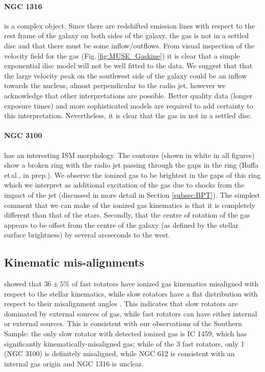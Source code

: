 	\paragraph{NGC 1316} is a complex object. Since there are redshifted emission lines with respect to the rest frame of the galaxy on both sides of the galaxy, the gas is not in a settled disc and that there must be some inflow/outflows. From visual inspection of the velocity field for the gas (Fig.\,\ref{fig:MUSE_Gaskine}) it is clear that a simple exponential disc model will not be well fitted to the data. We suggest that that the large velocity peak on the southwest side of the galaxy could be an inflow towards the nucleus, almost perpendicular to the radio jet, however we acknowledge that other interpretations are possible. Better quality data (longer exposure times) and more sophisticated models are required to add certainty to this interpretation. Nevertheless, it is clear that the gas in not in a settled disc. 


	\paragraph{NGC 3100} has an interesting ISM morphology. The  contours (shown in white in all figures) show a broken ring with the radio jet passing through the gaps in the ring (Ruffa et\,al., in prep.). We observe the ionized gas to be brightest in the gaps of this ring which we interpret as additional excitation of the gas due to shocks from the impact of the jet (discussed in more detail in Section \ref{subsec:BPT}). The simplest comment that we can make of the ionized gas kinematics is that it is completely different than that of the stars. Secondly, that the centre of rotation of the gas appears to be offset from the centre of the galaxy (as defined by the stellar surface brightness) by several arcseconds to the west. 

	\subsection{Kinematic mis-alignments}
		\citet{Davis2011a} showed that $36\pm5$\% of fast rotators have ionized gas kinematics misaligned with respect to the stellar kinematics, while slow rotators have a flat distribution with respect to their misalignment angles \citep[see fig.\ 4]{Davis2011a}. This indicates that slow rotators are dominated by external sources of gas, while fast rotators can have either internal or external sources. This is consistent with our observations of the Southern Sample: the only slow rotator with detected ionized gas is IC 1459, which has significantly kinematically-misaligned gas; while of the 3 fast rotators, only 1 (NGC 3100) is definitely misaligned, while NGC 612 is consistent with an internal gas origin and NGC 1316 is unclear.


